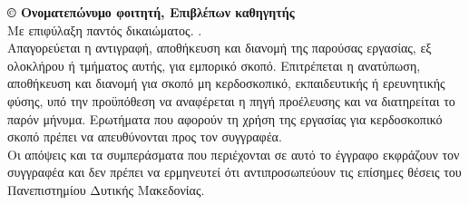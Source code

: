 \clearpage
\thispagestyle{empty}


{\normalsize \textbf{ © \the\year{} Ονοματεπώνυμο φοιτητή, Επιβλέπων καθηγητής}}\\
Με επιφύλαξη παντός δικαιώματος. .\\
\newline
Απαγορεύεται η αντιγραφή, αποθήκευση και διανομή της παρούσας εργασίας, εξ
ολοκλήρου ή τμήματος αυτής, για εμπορικό σκοπό. Επιτρέπεται η ανατύπωση,
αποθήκευση και διανομή για σκοπό μη κερδοσκοπικό, εκπαιδευτικής ή ερευνητικής
φύσης, υπό την προϋπόθεση να αναφέρεται η πηγή προέλευσης και να διατηρείται το
παρόν μήνυμα. Ερωτήματα που αφορούν τη χρήση της εργασίας για κερδοσκοπικό
σκοπό πρέπει να απευθύνονται προς τον συγγραφέα.\\
\newline
Οι απόψεις και τα συμπεράσματα που περιέχονται σε αυτό το έγγραφο εκφράζουν
τον συγγραφέα και δεν πρέπει να ερμηνευτεί ότι αντιπροσωπεύουν τις επίσημες
θέσεις του Πανεπιστημίου Δυτικής Μακεδονίας.

